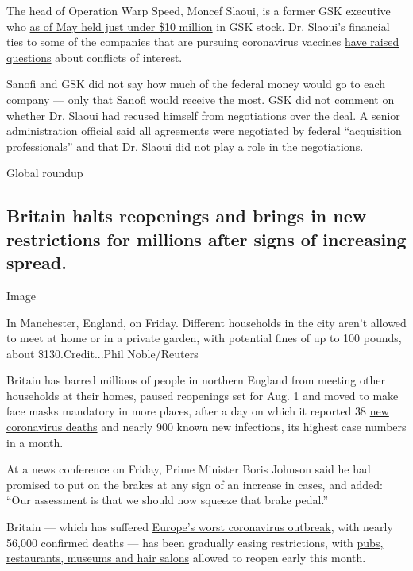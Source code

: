 The head of Operation Warp Speed, Moncef Slaoui, is a former GSK
executive who
\href{https://www.nytimes.com/2020/05/20/health/coronavirus-vaccine-czar.html}{as
of May held just under \$10 million} in GSK stock. Dr. Slaoui's
financial ties to some of the companies that are pursuing coronavirus
vaccines
\href{https://www.nytimes.com/2020/07/15/us/politics/vaccine-Slaoui-coronavirus-trump.html}{have
raised questions} about conflicts of interest.

Sanofi and GSK did not say how much of the federal money would go to
each company --- only that Sanofi would receive the most. GSK did not
comment on whether Dr. Slaoui had recused himself from negotiations over
the deal. A senior administration official said all agreements were
negotiated by federal ``acquisition professionals'' and that Dr. Slaoui
did not play a role in the negotiations.

Global roundup

\hypertarget{britain-halts-reopenings-and-brings-in-new-restrictions-for-millions-after-signs-of-increasing-spread}{%
\subsection{Britain halts reopenings and brings in new restrictions for
millions after signs of increasing
spread.}\label{britain-halts-reopenings-and-brings-in-new-restrictions-for-millions-after-signs-of-increasing-spread}}

Image

In Manchester, England, on Friday. Different households in the city
aren't allowed to meet at home or in a private garden, with potential
fines of up to 100 pounds, about \$130.Credit...Phil Noble/Reuters

Britain has barred millions of people in northern England from meeting
other households at their homes, paused reopenings set for Aug. 1 and
moved to make face masks mandatory in more places, after a day on which
it reported 38
\href{https://www.nytimes.com/interactive/2020/world/europe/united-kingdom-coronavirus-cases.html}{new
coronavirus deaths} and nearly 900 known new infections, its highest
case numbers in a month.

At a news conference on Friday, Prime Minister Boris Johnson said he had
promised to put on the brakes at any sign of an increase in cases, and
added: ``Our assessment is that we should now squeeze that brake
pedal.''

Britain --- which has suffered
\href{https://www.nytimes.com/2020/07/30/world/europe/UK-deaths-coronavirus-europe.html}{Europe's
worst coronavirus outbreak}, with nearly 56,000 confirmed deaths --- has
been gradually easing restrictions, with
\href{https://www.nytimes.com/2020/06/23/world/europe/uk-coronavirus-reopening.html}{pubs,
restaurants, museums and hair salons} allowed to reopen early this
month.

